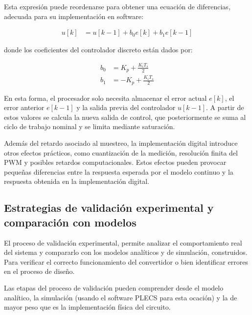 \documentclass[conference]{IEEEtran}
\begin{document}
Esta expresión puede reordenarse para obtener una ecuación de diferencias, adecuada para su implementación en software:

\begin{equation}
\begin{aligned}
    u[k] &= u[k-1] + b_0 e[k] + b_1 e[k-1]
\end{aligned}
\label{eq:ecuacion_diferencias_pi}
\end{equation}

donde los coeficientes del controlador discreto están dados por:

\begin{equation}
\begin{aligned}
    b_0 &= K_p + \frac{K_i T_s}{2} \\
    b_1 &= -K_p + \frac{K_i T_s}{2}
\end{aligned}
\label{eq:coeficientes_pi_discreto}
\end{equation}

En esta forma, el procesador solo necesita almacenar el error actual $e[k]$, el error anterior $e[k-1]$ y la salida previa del controlador $u[k-1]$. A partir de estos valores se calcula la nueva salida de control, que posteriormente se suma al ciclo de trabajo nominal y se limita mediante saturación.

Además del retardo asociado al muestreo, la implementación digital introduce otros efectos prácticos, como cuantización de la medición, resolución finita del PWM y posibles retardos computacionales. Estos efectos pueden provocar pequeñas diferencias entre la respuesta esperada por el modelo continuo y la respuesta obtenida en la implementación digital. 




\subsection{Estrategias de validación experimental y comparación con modelos}
El proceso de validación experimental, permite analizar el comportamiento real del sistema y compararlo
con los modelos analíticos y de simulación, construidos. Para verificar el correcto funcionamiento del convertidor
o bien identificar errores en el proceso de diseño.

Las etapas del proceso de validación pueden comprender desde el modelo analítico, la simulación (usando el software
PLECS para esta ocación) y la de mayor peso que es la implementación física del circuito.
\end{document}

